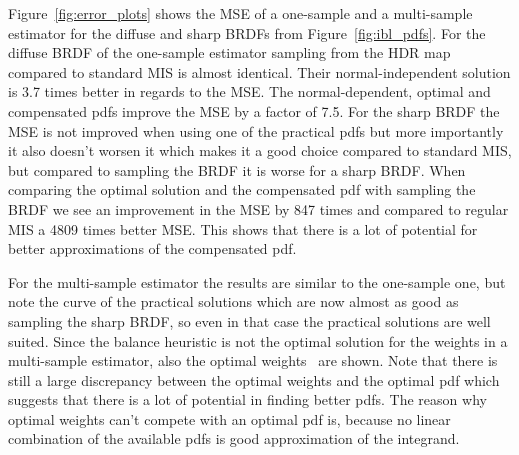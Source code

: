 Figure~\ref{fig:error_plots} shows the MSE of a one-sample and a multi-sample estimator for the diffuse and sharp BRDFs from Figure~\ref{fig:ibl_pdfs}.
For the diffuse BRDF of the one-sample estimator sampling from the HDR map compared to standard MIS is almost identical.
Their normal-independent solution is 3.7 times better in regards to the MSE.
The normal-dependent, optimal and compensated pdfs improve the MSE by a factor of 7.5.
For the sharp BRDF the MSE is not improved when using one of the practical pdfs but more importantly it also doesn't worsen it which makes it a good choice compared to standard MIS,
but compared to sampling the BRDF it is worse for a sharp BRDF.
When comparing the optimal solution and the compensated pdf with sampling the BRDF we see an improvement in the MSE by 847 times and compared to regular MIS a 4809 times better MSE.
This shows that there is a lot of potential for better approximations of the compensated pdf.

For the multi-sample estimator the results are similar to the one-sample one,
but note the curve of the practical solutions which are now almost as good as sampling the sharp BRDF,
so even in that case the practical solutions are well suited.
Since the balance heuristic is not the optimal solution for the weights in a multi-sample estimator,
also the optimal weights~\cite{Kondapaneni2019} are shown.
Note that there is still a large discrepancy between the optimal weights and the optimal pdf which suggests that there is a lot of potential in finding better pdfs.
The reason why optimal weights can't compete with an optimal pdf is, because no linear combination of the available pdfs is good approximation of the integrand.

